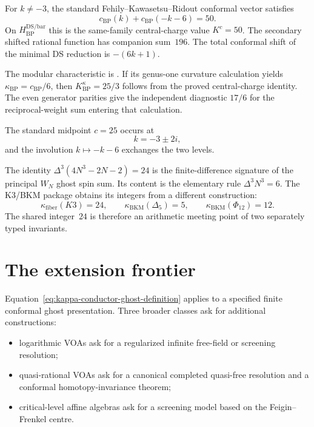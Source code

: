 \begin{corollary}
\label{cor:K-BP}
\ClaimStatusProvedHere
For $k\ne-3$, the standard Fehily--Kawasetsu--Ridout conformal vector
satisfies
\[
c_{\mathrm{BP}}(k)+c_{\mathrm{BP}}(-k-6)=50.
\]
On $H_{\mathrm{BP}}^{\mathrm{DS/bar}}$ this is the same-family
central-charge value $K^c=50$.  The secondary shifted rational function
has companion sum~$196$.  The total conformal shift of the minimal DS
reduction is $-(6k+1)$.

The modular characteristic is \ClaimStatusOpen.  If its genus-one
curvature calculation yields
$\kappa_{\mathrm{BP}}=c_{\mathrm{BP}}/6$, then
$K^\kappa_{\mathrm{BP}}=25/3$ follows from the proved central-charge
identity.  The even generator parities give the independent diagnostic
$17/6$ for the reciprocal-weight sum entering that calculation.

The standard midpoint $c=25$ occurs at
\[
k=-3\pm2i,
\]
and the involution $k\mapsto-k-6$ exchanges the two levels.
\end{corollary}

\begin{remark}
\label{rem:third-difference-24}
The identity
$\Delta^3(4N^3-2N-2)=24$ is the finite-difference signature of the
principal $W_N$ ghost spin sum.  Its content is the elementary rule
$\Delta^3N^3=6$.  The K3/BKM package obtains its integers from a
different construction:
\[
\kappa_{\mathrm{fiber}}(K3)=24,
\qquad
\kappa_{\mathrm{BKM}}(\Delta_5)=5,
\qquad
\kappa_{\mathrm{BKM}}(\Phi_{12})=12.
\]
The shared integer~$24$ is therefore an arithmetic meeting point of
two separately typed invariants.
\end{remark}

\section{The extension frontier}
\label{sec:conductor-exclusion-frontier}

Equation~\eqref{eq:kappa-conductor-ghost-definition} applies to a
specified finite conformal ghost presentation.  Three broader classes
ask for additional constructions:
\begin{itemize}
\item logarithmic VOAs ask for a regularized infinite free-field or
screening resolution;
\item quasi-rational VOAs ask for a canonical completed quasi-free
resolution and a conformal homotopy-invariance theorem;
\item critical-level affine algebras ask for a screening model based on
the Feigin--Frenkel centre.
\end{itemize}

